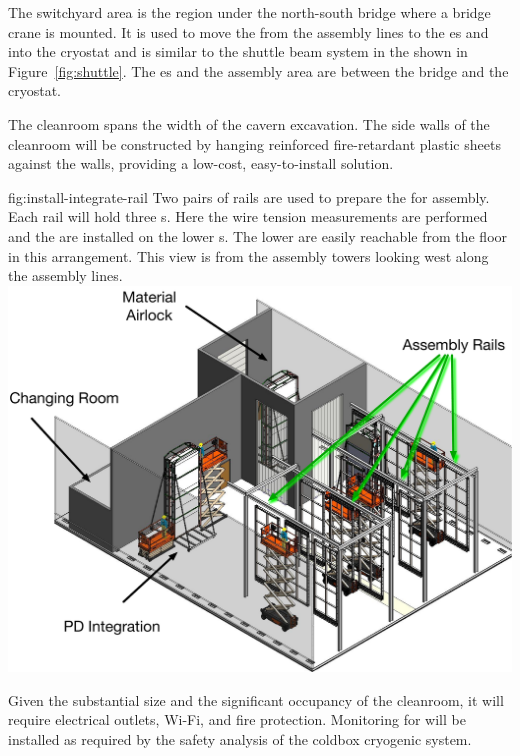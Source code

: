 The switchyard area is the region under the north-south bridge where a bridge crane is mounted. It is used to move the  from the assembly lines to the \coldbox{}es and into the cryostat and is similar to the shuttle beam system in the  shown in Figure~\ref{fig:shuttle}. The \coldbox{}es and the  assembly area are between the bridge and the cryostat.


The cleanroom spans the width of the cavern excavation. The side walls of the cleanroom will be constructed by hanging reinforced fire-retardant plastic sheets against the walls, providing a low-cost, easy-to-install solution. 


\begin{dunefigure}{fig:install-integrate-rail}
  {Two pairs of rails are used to prepare the  for assembly. Each rail will hold three s. Here the wire tension measurements are performed and the   are installed on the lower s. The lower  are easily reachable from the floor in this arrangement. This view is from the assembly towers looking west along the assembly lines.}
\includegraphics[width=.8\textwidth]{graphics/install-integrate-rail.pdf}
\end{dunefigure}


Given the substantial size and the significant occupancy of the cleanroom, it will require electrical outlets, Wi-Fi, and fire protection. Monitoring for  will be installed as required by the safety analysis of the coldbox cryogenic system.

